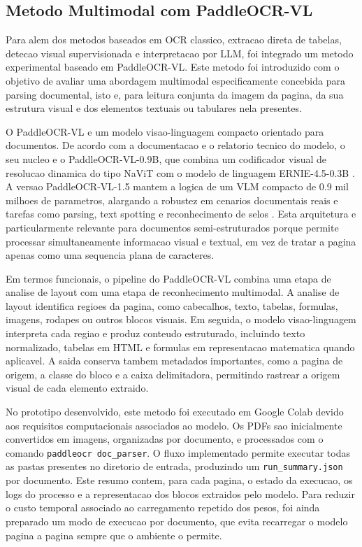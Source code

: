 \subsection{Metodo Multimodal com PaddleOCR-VL}

Para alem dos metodos baseados em OCR classico, extracao direta de tabelas,
detecao visual supervisionada e interpretacao por LLM, foi integrado um metodo
experimental baseado em PaddleOCR-VL. Este metodo foi introduzido com o objetivo
de avaliar uma abordagem multimodal especificamente concebida para parsing
documental, isto e, para leitura conjunta da imagem da pagina, da sua estrutura
visual e dos elementos textuais ou tabulares nela presentes.

O PaddleOCR-VL e um modelo visao-linguagem compacto orientado para documentos.
De acordo com a documentacao e o relatorio tecnico do modelo, o seu nucleo e o
PaddleOCR-VL-0.9B, que combina um codificador visual de resolucao dinamica do
tipo NaViT com o modelo de linguagem ERNIE-4.5-0.3B
\cite{cui2025paddleocrvl,paddleocrvl_docs}. A versao PaddleOCR-VL-1.5 mantem a
logica de um VLM compacto de 0.9 mil milhoes de parametros, alargando a robustez
em cenarios documentais reais e tarefas como parsing, text spotting e
reconhecimento de selos \cite{cui2026paddleocrvl15}. Esta arquitetura e
particularmente relevante para documentos semi-estruturados porque permite
processar simultaneamente informacao visual e textual, em vez de tratar a pagina
apenas como uma sequencia plana de caracteres.

Em termos funcionais, o pipeline do PaddleOCR-VL combina uma etapa de analise de
layout com uma etapa de reconhecimento multimodal. A analise de layout identifica
regioes da pagina, como cabecalhos, texto, tabelas, formulas, imagens, rodapes
ou outros blocos visuais. Em seguida, o modelo visao-linguagem interpreta cada
regiao e produz conteudo estruturado, incluindo texto normalizado, tabelas em
HTML e formulas em representacao matematica quando aplicavel. A saida conserva
tambem metadados importantes, como a pagina de origem, a classe do bloco e a
caixa delimitadora, permitindo rastrear a origem visual de cada elemento
extraido.

No prototipo desenvolvido, este metodo foi executado em Google Colab devido aos
requisitos computacionais associados ao modelo. Os PDFs sao inicialmente
convertidos em imagens, organizadas por documento, e processados com o comando
\texttt{paddleocr doc\_parser}. O fluxo implementado permite executar todas as
pastas presentes no diretorio de entrada, produzindo um \texttt{run\_summary.json}
por documento. Este resumo contem, para cada pagina, o estado da execucao, os
logs do processo e a representacao dos blocos extraidos pelo modelo. Para reduzir
o custo temporal associado ao carregamento repetido dos pesos, foi ainda
preparado um modo de execucao por documento, que evita recarregar o modelo
pagina a pagina sempre que o ambiente o permite.

